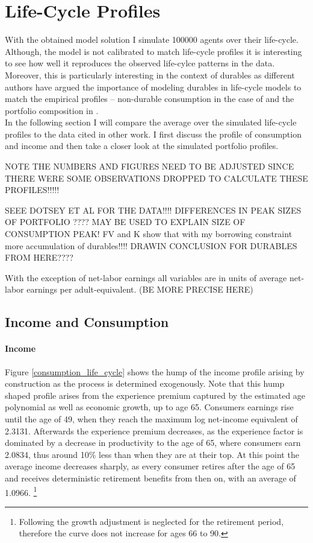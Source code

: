 \documentclass[12pt,a4paper,leqno]{article}
\theoremstyle{definition}
\begin{document}
\section{Life-Cycle Profiles}
\label{life_cycle_profiles}

With the obtained model solution I simulate 100000 agents over their life-cycle. Although, the model is not calibrated to match life-cycle profiles it is interesting to see how well it reproduces the observed life-cylce patterns in the data. Moreover, this is particularly interesting in the context of durables as different authors have argued the importance of modeling durables in life-cycle models to match the empirical profiles \--- non-durable consumption in the case of \cite{FV&K2011} and the portfolio composition in \cite{yang2009}. \\
In the following section I will compare the average over the simulated life-cycle profiles to the data cited in other work. I first discuss the profile of consumption and income and then take a closer look at the simulated portfolio profiles. 

NOTE THE NUMBERS AND FIGURES NEED TO BE ADJUSTED SINCE THERE WERE SOME OBSERVATIONS DROPPED TO CALCULATE THESE PROFILES!!!!!

SEEE DOTSEY ET AL FOR THE DATA!!!! 
DIFFERENCES IN PEAK SIZES OF PORTFOLIO ???? MAY BE USED TO EXPLAIN SIZE OF CONSUMPTION PEAK! 
FV and K show that with my borrowing constraint more accumulation of durables!!!! 
DRAWIN CONCLUSION FOR DURABLES FROM HERE???? 


With the exception of net-labor earnings all variables are in units of average net-labor earnings per adult-equivalent. (BE MORE PRECISE HERE) 

\subsection{Income and Consumption}

\paragraph{Income} Figure \ref{consumption_life_cycle} shows the hump of the income profile arising by construction as the process is determined exogenously. Note that this hump shaped profile arises from the experience premium captured by the estimated age polynomial as well as economic growth, up to age 65. Consumers earnings rise until the age of 49, when they reach the maximum log net-income equivalent of 2.3131. Afterwards the experience premium decreases, as the experience factor is dominated by a decrease in productivity to the age of 65, where consumers earn 2.0834, thus around 10\% less than when they are at their top. At this point the average income decreases sharply, as every consumer retires after the age of 65 and receives deterministic retirement benefits from then on, with an average of 1.0966. \footnote{Following \cite{hintermaier2011} the growth adjustment is neglected for the retirement period, therefore the curve does not increase for ages 66 to 90.} 
\end{document}
